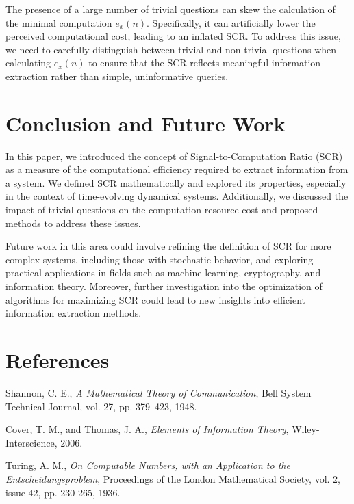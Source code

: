 \documentclass[11pt,a4paper]{article}
\theoremstyle{definition}
\theoremstyle{remark}
\numberwithin{equation}{section}
\begin{document}
The presence of a large number of trivial questions can skew the calculation of the minimal computation \(e_x(n)\). Specifically, it can artificially lower the perceived computational cost, leading to an inflated SCR. To address this issue, we need to carefully distinguish between trivial and non-trivial questions when calculating \(e_x(n)\) to ensure that the SCR reflects meaningful information extraction rather than simple, uninformative queries.

\section{Conclusion and Future Work}
In this paper, we introduced the concept of Signal-to-Computation Ratio (SCR) as a measure of the computational efficiency required to extract information from a system. We defined SCR mathematically and explored its properties, especially in the context of time-evolving dynamical systems. Additionally, we discussed the impact of trivial questions on the computation resource cost and proposed methods to address these issues.

Future work in this area could involve refining the definition of SCR for more complex systems, including those with stochastic behavior, and exploring practical applications in fields such as machine learning, cryptography, and information theory. Moreover, further investigation into the optimization of algorithms for maximizing SCR could lead to new insights into efficient information extraction methods.

\section{References}
\begin{thebibliography}{99}
    Shannon, C. E., \textit{A Mathematical Theory of Communication}, Bell System Technical Journal, vol. 27, pp. 379–423, 1948.
    
    Cover, T. M., and Thomas, J. A., \textit{Elements of Information Theory}, Wiley-Interscience, 2006.
    
    Turing, A. M., \textit{On Computable Numbers, with an Application to the Entscheidungsproblem}, Proceedings of the London Mathematical Society, vol. 2, issue 42, pp. 230-265, 1936.
\end{thebibliography}
\end{document}
